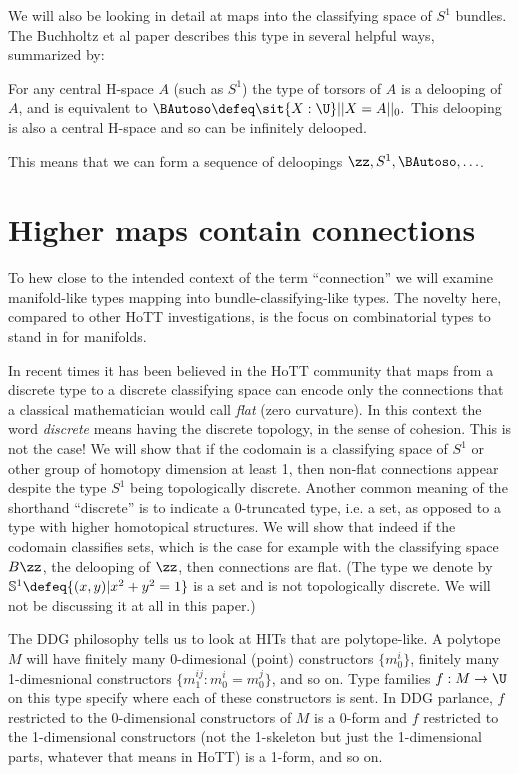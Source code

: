 We will also be looking in detail at maps into the classifying space of
\(S^1\) bundles. The Buchholtz et al paper\cite{buchholtz2023central}
describes this type in several helpful ways, summarized by:

\begin{mythm}
For any central H-space \( A \) (such as \( S^1 \)) the type of torsors of \( A \) is a delooping of \( A \), and is equivalent to \( \BAutoso\defeq \sit{X:\U}||X=A||_0. \) This delooping is also a central H-space and so can be infinitely delooped.
\end{mythm}

This means that we can form a sequence of deloopings
\(\zz, S^1, \BAutoso, \ldots\).

\section{Higher maps contain
connections}\label{higher-maps-contain-connections}

To hew close to the intended context of the term ``connection'' we will
examine manifold-like types mapping into bundle-classifying-like types.
The novelty here, compared to other HoTT investigations, is the focus on
combinatorial types to stand in for manifolds.

In recent times it has been believed in the HoTT community that maps
from a discrete type to a discrete classifying space can encode only the
connections that a classical mathematician would call \emph{flat} (zero
curvature). In this context the word \emph{discrete} means having the
discrete topology, in the sense of cohesion\cite{shulman_cohesion}. This
is not the case! We will show that if the codomain is a classifying
space of \(S^1\) or other group of homotopy dimension at least 1, then
non-flat connections appear despite the type \(S^1\) being topologically
discrete. Another common meaning of the shorthand ``discrete'' is to
indicate a 0-truncated type, i.e. a set, as opposed to a type with
higher homotopical structures. We will show that indeed if the codomain
classifies sets, which is the case for example with the classifying
space \(B\zz\), the delooping of \(\zz\), then connections are flat.
(The type we denote by \(\mathbb{S}^1\defeq\{(x, y)|x^2+y^2=1\}\) is a
set and is not topologically discrete. We will not be discussing it at
all in this paper.)

The DDG philosophy tells us to look at HITs that are polytope-like. A
polytope \(M\) will have finitely many 0-dimesional (point) constructors
\(\{m_0^i\}\), finitely many 1-dimesnional constructors
\(\{m_1^{ij}:m_0^i=m_0^j\}\), and so on. Type families \(f:M\to \U\) on
this type specify where each of these constructors is sent. In DDG
parlance, \(f\) restricted to the 0-dimensional constructors of \(M\) is
a 0-form and \(f\) restricted to the 1-dimensional constructors (not the
1-skeleton but just the 1-dimensional parts, whatever that means in
HoTT) is a 1-form, and so on.

